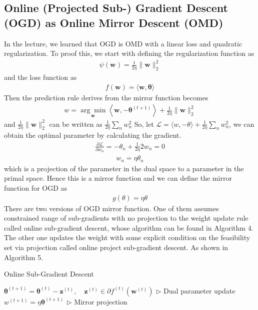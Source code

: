 \documentclass[11pt]{article}
\begin{document}
\subsection{Online (Projected Sub-) Gradient Descent (OGD) as Online Mirror Descent (OMD)}
In the lecture, we learned that OGD is OMD with a linear loss and quadratic regularization. To proof this, we start with defining the regularization function as 
\begin{align}
    \psi(\boldsymbol{w})=\frac{1}{2 \eta}\|\boldsymbol{w}\|_{2}^{2}
\end{align}
and the loss function as 
\begin{align}
    f(\boldsymbol{w})=\langle\boldsymbol{w}, \boldsymbol{\theta}\rangle
\end{align}
Then the prediction rule derives from the mirror function becomes  
\begin{align}
    w =\underset{\boldsymbol{w}}{\arg \min }\left\langle\boldsymbol{w},-\boldsymbol{\theta}^{(t+1)}\right\rangle+\frac{1}{2 \eta}\|\boldsymbol{w}\|_{2}^{2}
\end{align}
and $\frac{1}{2 \eta}\|\boldsymbol{w}\|_{2}^{2}$ can be written as $\frac{1}{2 \eta} \sum_{n} w_{n}^{2}$ So, let $\mathcal{L}=\langle w,-\theta\rangle+\frac{1}{2 \eta} \sum_{n} w_{n}^{2}$, we can obtain the optimal parameter by calculating the gradient. 
\begin{align}
    \frac{\partial \mathcal{L}}{\partial w_{n}}=-\theta_{n}+\frac{1}{2 \eta} 2 w_{n}=0
\end{align}
\begin{align}
    w_{n}=\eta \theta_{n}    
\end{align}
which is a projection of the parameter in the dual space to a parameter in the primal space. Hence this is a mirror function and we can define the mirror function for OGD as 
\begin{align}
    g(\theta) = \eta\theta
\end{align}
There are two versions of OGD mirror function. One of them assumes constrained range of sub-gradients with no projection to the weight update rule called online sub-gradient descent, whose algorithm can be found in Algorithm 4. The other one updates the weight with some explicit condition on the feasibility set via projection called online project sub-gradient descent. As shown in Algorithm 5. 
\begin{algorithm}[H]
\caption{Online Sub-Gradient Descent}
\label{algo:osgd}
\begin{algorithmic}[1]
\STATE $\boldsymbol{\theta}^{(t+1)}=\boldsymbol{\theta}^{(t)}-\boldsymbol{z}^{(t)}, \quad \boldsymbol{z}^{(t)} \in \partial f^{(t)}\left(\boldsymbol{w}^{(t)}\right)$ \hfill $\triangleright$ Dual parameter update
\STATE $w^{(t+1)}= \eta \boldsymbol{\theta}^{(t+1)}$ \hfill $\triangleright$ Mirror projection
\ENDFOR
\end{algorithmic}
\end{algorithm}
\end{document}
